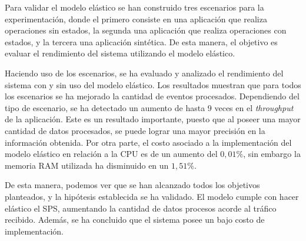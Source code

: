 Para validar el modelo el\'astico se \normalsize{han} construido tres escenarios para la experimentaci\'on, donde el \normalsize{primero} consiste en una aplicaci\'on que realiza operaciones sin estados, la segunda una aplicaci\'on que realiza operaciones con estados, y la tercera una aplicaci\'on sint\'etica. De esta manera, el objetivo es evaluar el rendimiento del sistema utilizando el modelo el\'astico.


Haciendo uso de los escenarios, se ha evaluado y analizado el rendimiento del sistema con y sin uso del modelo el\'astico. Los resultados muestran que para todos los escenarios se ha mejorado la cantidad de eventos procesados. Dependiendo del tipo de escenario, se ha detectado un aumento de hasta 9 veces en el \textit{throughput} de la aplicaci\'on. Este es un resultado importante, puesto que al poseer una mayor cantidad de datos procesados, se puede lograr una mayor precisi\'on en la informaci\'on obtenida. Por otra parte, el costo asociado a la implementaci\'on del modelo el\'astico en relaci\'on a la CPU es de un aumento del $0,01\%$, sin embargo la memoria RAM utilizada ha disminuido en un $1,51\%$.


De esta manera, podemos ver que se han alcanzado todos los objetivos planteados, y la hip\'otesis establecida se ha validado. El modelo cumple con hacer el\'astico el SPS, aumentando la cantidad de datos procesos acorde al tr\'afico recibido. Adem\'as, se ha concluido que el sistema posee un bajo costo de implementaci\'on.

